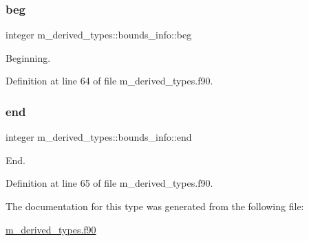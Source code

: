 \subsubsection{\texorpdfstring{beg}{beg}}
{\footnotesize\ttfamily integer m\+\_\+derived\+\_\+types\+::bounds\+\_\+info\+::beg}



Beginning. 



Definition at line 64 of file m\+\_\+derived\+\_\+types.\+f90.

\mbox{\label{structm__derived__types_1_1bounds__info_a7bc03a7a90da94d38e6656d65281bc35}} 
\subsubsection{\texorpdfstring{end}{end}}
{\footnotesize\ttfamily integer m\+\_\+derived\+\_\+types\+::bounds\+\_\+info\+::end}



End. 



Definition at line 65 of file m\+\_\+derived\+\_\+types.\+f90.



The documentation for this type was generated from the following file\+:\begin{DoxyCompactItemize}
\item 
\hyperlink{m__derived__types_8f90}{m\+\_\+derived\+\_\+types.\+f90}\end{DoxyCompactItemize}
